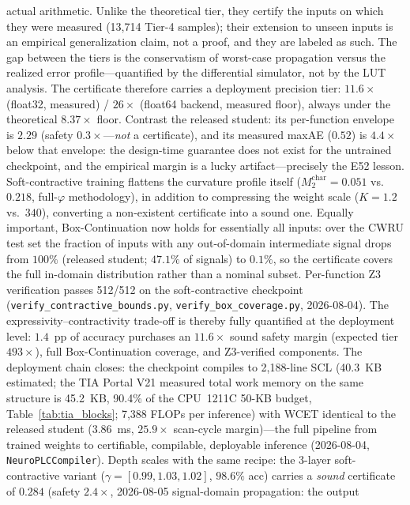 actual arithmetic. Unlike the theoretical tier, they certify the inputs
on which they were measured (13{,}714 Tier-4 samples); their extension
to unseen inputs is an empirical generalization claim, not a proof, and
they are labeled as such. The gap between the tiers is the conservatism
of worst-case propagation versus the realized error profile---quantified
by the differential simulator, not by the LUT analysis. The certificate
therefore carries a deployment precision tier: $11.6\times$ (float32,
measured) / $26\times$ (float64 backend, measured floor), always under
the theoretical $8.37\times$ floor. Contrast the
released student: its per-function envelope is $2.29$
(safety $0.3\times$---\emph{not} a certificate), and its measured maxAE
($0.52$) is $4.4\times$ below that envelope: the design-time guarantee
does not exist for the untrained checkpoint, and the empirical margin is
a lucky artifact---precisely the E52 lesson. Soft-contractive training
flattens the curvature profile itself ($M_2^{\text{char}} = 0.051$ vs.\
$0.218$, full-$\varphi$ methodology), in addition to compressing the
weight scale ($K = 1.2$ vs.\ $340$), converting a non-existent
certificate into a sound one. Equally important,
Box-Continuation now holds for essentially all inputs: over the CWRU
test set the fraction of inputs with any out-of-domain intermediate
signal drops from $100\%$ (released student; $47.1\%$ of signals) to
$0.1\%$, so the certificate covers the full in-domain distribution
rather than a nominal subset. Per-function Z3 verification passes
512/512 on the soft-contractive checkpoint
(\texttt{verify\_contractive\_bounds.py}, \texttt{verify\_box\_coverage.py},
2026-08-04). The expressivity--contractivity trade-off is thereby fully
quantified at the deployment level: $1.4$~pp of accuracy purchases an
$11.6\times$ sound safety margin (expected tier $493\times$), full
Box-Continuation coverage, and Z3-verified components. The deployment chain closes: the checkpoint
compiles to 2{,}188-line SCL (40.3~KB estimated; the TIA Portal V21
measured total work memory on the same structure is 45.2~KB, 90.4\% of
the CPU~1211C 50-KB budget, Table~\ref{tab:tia_blocks}; 7{,}388 FLOPs
per inference) with WCET identical to the released
student ($3.86$~ms, $25.9\times$ scan-cycle margin)---the full pipeline
from trained weights to certifiable, compilable, deployable inference
(2026-08-04, \texttt{NeuroPLCCompiler}). Depth scales with the same
recipe: the 3-layer soft-contractive variant ($\gamma = [0.99, 1.03,
1.02]$, $98.6\%$ acc) carries a \emph{sound} certificate of $0.284$
(safety $2.4\times$, 2026-08-05 signal-domain propagation: the output
